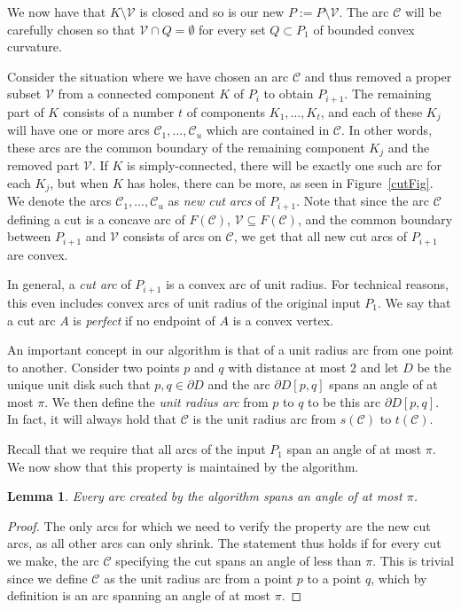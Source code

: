 \documentclass{article}
\newcommand{\PP}{P}
\newcommand{\QQ}{Q}
\newcommand{\KO}{K}
\newcommand{\VV}{\mathcal V}
\newcommand{\cutreg}{F}
\newcommand{\cut}{\mathcal C}
\newcommand{\start}{s}
\newcommand{\terminal}{t}
\newcommand{\arcA}{A}
\newcommand{\mydef}{:=}
\newtheorem{lemma}[theorem]{Lemma}
\begin{document}
We now have that $\KO \setminus\VV$ is closed and so is our new
$\PP\mydef \PP \setminus \VV$.
The arc $\cut$ will be carefully chosen so that
$\VV\cap\QQ=\emptyset$ for every set $\QQ\subset\PP_1$
of bounded convex curvature.

Consider the situation where we have chosen an arc $\cut$ and thus removed a proper subset $\VV$ from a connected component $\KO$ of $\PP_i$ to obtain $\PP_{i+1}$.
The remaining part of $\KO$ consists of a number $t$ of components $\KO_1,\ldots,\KO_t$, and each of these $\KO_j$ will have one or more arcs $\cut_1,\ldots,\cut_u$ which are contained in $\cut$.
In other words, these arcs are the common boundary of the remaining component $\KO_j$ and the removed part $\VV$.
If $\KO$ is simply-connected, there will be exactly one such arc for each $\KO_j$, but when $\KO$ has holes, there can be more, as seen in Figure~\ref{cutFig}.
We denote the arcs $\cut_{1},\ldots,\cut_{u}$ as \emph{new cut arcs} of $\PP_{i+1}$.
Note that since the arc $\cut$ defining a cut is a concave arc of $\cutreg(\cut)$, $\VV\subseteq\cutreg(\cut)$, and the common boundary between $\PP_{i+1}$ and $\VV$ consists of arcs on $\cut$, we get that all new cut arcs of $\PP_{i+1}$ are convex.

In general, a \emph{cut arc} of $\PP_{i+1}$ is a convex arc of unit radius. 
For technical reasons, this even includes convex arcs of unit radius of the original input $\PP_1$.
We say that a cut arc $\arcA$ is \emph{perfect} if no endpoint of $\arcA$ is a convex vertex.

An important concept in our algorithm is that of a unit radius arc from one point to another.
Consider two points $p$ and $q$ with distance at most $2$ and let $D$ be the unique unit disk such that $p,q\in \partial D$ and the arc $\partial D[p,q]$ spans an angle of at most $\pi$.
We then define the \emph{unit radius arc} from $p$ to $q$ to be this arc $\partial D[p,q]$.
In fact, it will always hold that $\cut$ is the unit radius arc from $\start(\cut)$ to $\terminal(\cut)$.

Recall that we require that all arcs of the input $\PP_1$ span an angle of at most $\pi$.
We now show that this property is maintained by the algorithm.

\begin{lemma}\label{lem:leqpi}
Every arc created by the algorithm spans an angle of at most $\pi$.
\end{lemma}

\begin{proof}
The only arcs for which we need to verify the property are the new cut arcs, as all other arcs can only shrink.
The statement thus holds if for every cut we make, the arc $\cut$ specifying the cut spans an angle of less than $\pi$.
This is trivial since we define $\cut$ as the unit radius arc from a point $p$ to a point $q$, which by definition is an arc spanning an angle of at most $\pi$.
\end{proof}
\end{document}
